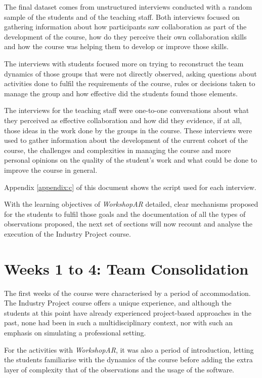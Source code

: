 The final dataset comes from unstructured interviews conducted with a random sample of the students and of the teaching staff. Both interviews focused on gathering
information about how participants saw collaboration as part of the development of the course, how do they perceive their own collaboration skills and how the course was
helping them to develop or improve those skills.

The interviews with students focused more on trying to reconstruct the team dynamics of those groups that were not directly observed, asking questions about activities
done to fulfil the requirements of the course, rules or decisions taken to manage the group and how effective did the students found those elements.

The interviews for the teaching staff were one-to-one conversations about what they perceived as effective collaboration and how did they evidence, if at all, those ideas
in the work done by the groups in the course. These interviews were used to gather information about the development of the current cohort of the course, the challenges
and complexities in managing the course and more personal opinions on the quality of the student's work and what could be done to improve the course in general.

Appendix \ref{appendix:c} of this document shows the script used for each interview.

With the learning objectives of \emph{WorkshopAR} detailed, clear mechanisms proposed for the students to fulfil those goals and the documentation of all the types of
observations proposed, the next set of sections will now recount and analyse the execution of the Industry Project course.

\section{Weeks 1 to 4: Team Consolidation \label{sec:6-4}}

The first weeks of the course were characterised by a period of accommodation. The Industry Project course offers a unique experience, and although the students at this
point have already experienced project-based approaches in the past, none had been in such a multidisciplinary context, nor with such an emphasis on simulating a
professional setting.

For the activities with \emph{WorkshopAR}, it was also a period of introduction, letting the students familiarise with the dynamics of the course before adding the extra
layer of complexity that of the observations and the usage of the software.

